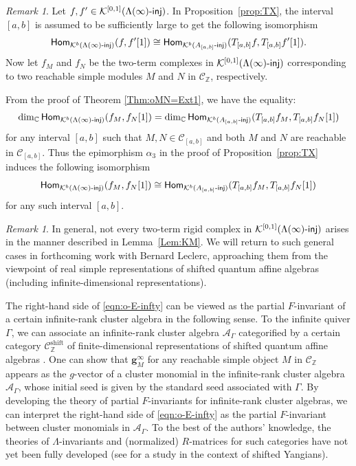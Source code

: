 \documentclass[12pt]{amsart}
\theoremstyle{definition}
\theoremstyle{remark}
\newtheorem{remark}[theorem]{Remark}
\numberwithin{equation}{section}
\newcommand{\opname}[1]{\operatorname{\mathsf{#1}}}
\newcommand{\Hom}{\opname{Hom}}
\newcommand{\injc}{\mathchar`-\mathsf{inj}}
\begin{document}
\begin{remark}\label{rem:oKR2}
Let $f,f'\in \mathcal{K}^{[0,1]}(\Lambda(\infty)\injc)$. In Proposition~\ref{prop:TX}, 
   the interval $[a,b]$ is assumed to be
   sufficiently large to get the 
 following isomorphism 
 \[ \Hom_{\mathcal{K}^b(\Lambda(\infty)\injc)}(f,f'[1]) \cong \Hom_{\mathcal{K}^b(A_{[a,b]}\injc)}(T_{[a,b]}f, T_{[a,b]}f'[1]).\]
Now let $f_M$ and $f_N$ be the two-term complexes in $\mathcal{K}^{[0,1]}(\Lambda(\infty)\injc)$ corresponding to two reachable simple modules $M$ and $N$ in $\mathcal C_{\mathbb Z}$, respectively.
 
From the proof of Theorem \ref{Thm:oMN=Ext1},
 we have the equality:  \[\dim_{\mathbb{C}} \Hom_{\mathcal{K}^b(\Lambda(\infty)\injc)}(f_M, f_N[1]) = \dim_{\mathbb{C}} \Hom_{\mathcal{K}^b(A_{[a,b]}\injc)}(T_{[a,b]}f_M,T_{[a,b]}f_N[1])\]
 for any interval $[a,b]$ such that $M,N\in\mathcal C_{[a,b]}$ and both $M$ and $N$ are reachable in $\mathcal{C}_{[a,b]}$. Thus the epimorphism $\alpha_3$ in the proof of Proposition~\ref{prop:TX} induces the following isomorphism
\[ \Hom_{\mathcal{K}^b(\Lambda(\infty)\injc)}(f_M,f_N[1]) \cong \Hom_{\mathcal{K}^b(A_{[a,b]}\injc)}(T_{[a,b]}f_M, T_{[a,b]}f_N[1])\]
 for any such interval $[a,b]$.
\end{remark}
\begin{remark}\label{rem:shifted}
In general, not every two-term rigid complex in $\mathcal{K}^{[0,1]}(\Lambda(\infty)\injc)$ arises in the manner described in Lemma~\ref{Lem:KM}.
    We will return to such general cases in forthcoming work with Bernard Leclerc, approaching them from the viewpoint of real simple representations of shifted quantum affine algebras (including infinite-dimensional representations).

The right-hand side of \eqref{eqn:o-E-infty} can be viewed as the partial $F$-invariant of a certain infinite-rank cluster algebra in the following sense.
To the infinite quiver $\Gamma$, we can associate an infinite-rank cluster algebra $\mathcal{A}_\Gamma$ categorified by a certain category $\mathcal{C}^{\mathrm{shift}}_{\mathbb{Z}}$ of finite-dimensional representations of shifted quantum affine algebras \cite{Her23,HL16b}.
One can show that $\mathbf{g}_M^\infty$ for any reachable simple object $M$ in $\mathcal{C}_\mathbb{Z}$ appears as the $g$-vector of a cluster monomial in the infinite-rank cluster algebra $\mathcal{A}_\Gamma$, whose initial seed is given by the standard seed associated with $\Gamma$. By developing the theory of partial $F$-invariants for infinite-rank cluster algebras, we can interpret the right-hand side of \eqref{eqn:o-E-infty} as the partial $F$-invariant between cluster monomials in $\mathcal{A}_\Gamma$.
To the best of the authors' knowledge, the theories of $\Lambda$-invariants and (normalized) $R$-matrices for such categories have not yet been fully developed (see \cite{HZ24} for a study in the context of shifted Yangians).
\end{remark}
\end{document}

